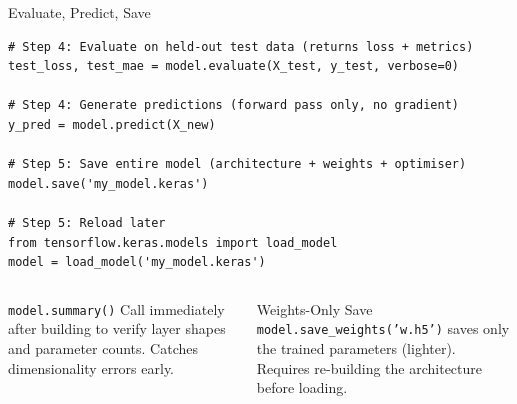 \documentclass[aspectratio=169, 11pt]{beamer}
\begin{document}
%
%
\begin{frame}[fragile]{Evaluate, Predict, Save}

\begin{lstlisting}
# Step 4: Evaluate on held-out test data (returns loss + metrics)
test_loss, test_mae = model.evaluate(X_test, y_test, verbose=0)

# Step 4: Generate predictions (forward pass only, no gradient)
y_pred = model.predict(X_new)

# Step 5: Save entire model (architecture + weights + optimiser)
model.save('my_model.keras')

# Step 5: Reload later
from tensorflow.keras.models import load_model
model = load_model('my_model.keras')
\end{lstlisting}

\vspace{0.2cm}

\begin{columns}[T]
\begin{block}{\small \texttt{model.summary()}}
\footnotesize
Call immediately after building to verify layer shapes and parameter counts. Catches dimensionality errors early.
\end{block}

\begin{block}{\small Weights-Only Save}
\footnotesize
\texttt{model.save\_weights('w.h5')} saves only the trained parameters (lighter). Requires re-building the architecture before loading.
\end{block}
\end{columns}

\end{frame}
%
%
\end{document}
